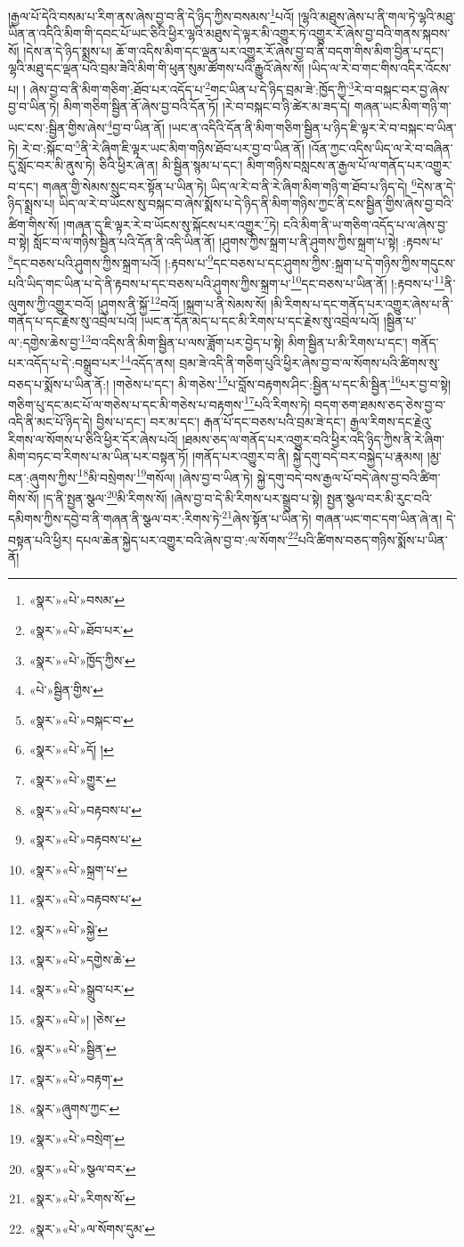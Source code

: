 །རྒྱལ་པོ་དེའི་བསམ་པ་རིག་ནས་ཞེས་བྱ་བ་ནི་དེ་ཉིད་ཀྱིས་བསམས་\footnote{«སྣར་»«པེ་»བསམ་}པའོ། །ལྷའི་མཐུས་ཞེས་པ་ནི་གལ་ཏེ་ལྷའི་མཐུ་ཡིན་ན་འདིའི་མིག་གི་དབང་པོ་ཡང་ཅིའི་ཕྱིར་ལྷའི་མཐུས་དེ་ལྟར་མི་འགྱུར་ཏེ་འགྱུར་རོ་ཞེས་བྱ་བའི་གནས་སྐབས་སོ། །དེས་ན་དེ་ཉིད་སྨྲས་པ། ཆོ་ག་འདིས་མིག་དང་ལྡན་པར་འགྱུར་རོ་ཞེས་བྱ་བ་ནི་བདག་གིས་མིག་བྱིན་པ་དང་། ལྷའི་མཐུ་དང་ལྡན་པའི་བྲམ་ཟེའི་མིག་གི་ཕུན་སུམ་ཚོགས་པའི་རྒྱུའོ་ཞེས་སོ། །ཡིད་ལ་རེ་བ་གང་གིས་འདིར་འོངས་པ། །
ཞེས་བྱ་བ་ནི་མིག་གཅིག་:ཐོབ་པར་འདོད་པ་\footnote{«སྣར་»«པེ་»ཐོབ་པར་}གང་ཡིན་པ་དེ་ཉིད་བྲམ་ཟེ་:ཁྱོད་ཀྱི་\footnote{«སྣར་»«པེ་»ཁྱོད་ཀྱིས་}རེ་བ་བསྐང་བར་བྱ་ཞེས་བྱ་བ་ཡིན་ཏེ། མིག་གཅིག་སྦྱིན་ནོ་ཞེས་བྱ་བའི་དོན་ཏོ། །རེ་བ་བསྐང་བ་ཉི་ཚེར་མ་ཟད་དེ། གཞན་ཡང་མིག་གཉི་ག་ཡང་ངས་:སྦྱིན་གྱིས་ཞེས་\footnote{«པེ་»སྦྱིན་གྱིས་}བྱ་བ་ཡིན་ནོ། །ཡང་ན་འདིའི་དོན་ནི་མིག་གཅིག་སྦྱིན་པ་ཉིད་ཇི་ལྟར་རེ་བ་བསྐང་བ་ཡིན་ཏེ། རེ་བ་:སྐོང་བ་\footnote{«སྣར་»«པེ་»བསྐང་བ་}ནི་རེ་ཞིག་ཇི་ལྟར་ཡང་མིག་གཉིས་ཐོབ་པར་བྱ་བ་ཡིན་ནོ། །འོན་ཀྱང་འདིས་ཡིད་ལ་རེ་བ་བཞིན་དུ་སློང་བར་མི་ནུས་ཏེ། ཅིའི་ཕྱིར་ཞེ་ན། མི་སྦྱིན་སྙམ་པ་དང་། མིག་གཉིས་བསླངས་ན་རྒྱལ་པོ་ལ་གནོད་པར་འགྱུར་བ་དང་། གཞན་གྱི་སེམས་སྲུང་བར་སྟོན་པ་ཡིན་ཏེ། ཡིད་ལ་རེ་བ་ནི་རེ་ཞིག་མིག་གཉི་ག་ཐོབ་པ་ཉིད་དེ། \footnote{«སྣར་»«པེ་»དོ། ། }དེས་ན་དེ་ཉིད་སྨྲས་པ། ཡིད་ལ་རེ་བ་ཡོངས་སུ་བསྐང་བ་ཞེས་སྨོས་པ་དེ་ཉིད་ནི་མིག་གཉིས་ཀྱང་ནི་ངས་སྦྱིན་གྱིས་ཞེས་བྱ་བའི་ཚིག་གིས་སོ། །གཞན་དུ་ཇི་ལྟར་རེ་བ་ཡོངས་སུ་སྐོངས་པར་འགྱུར་\footnote{«སྣར་»«པེ་»གྱུར་}ཏེ། ངའི་མིག་ནི་ཡ་གཅིག་འདོད་པ་ལ་ཞེས་བྱ་བ་སྟེ། སློང་བ་ལ་གཉིས་སྦྱིན་པའི་དོན་ནི་འདི་ཡིན་ནོ། །ཤུགས་ཀྱིས་སྐྲག་པ་ནི་ཤུགས་ཀྱིས་སྐྲག་པ་སྟེ། :རྟབས་པ་\footnote{«སྣར་»«པེ་»བརྟབས་པ་}དང་བཅས་པའི་ཤུགས་ཀྱིས་སྐྲག་པའོ། །:རྟབས་པ་\footnote{«སྣར་»«པེ་»བརྟབས་པ་}དང་བཅས་པ་དང་ཤུགས་ཀྱིས་:སྐྲག་པ་དེ་གཉིས་ཀྱིས་གདུངས་པའི་ཡིད་གང་ཡིན་པ་དེ་ནི་རྟབས་པ་དང་བཅས་པའི་ཤུགས་ཀྱིས་སྐྲག་པ་\footnote{«སྣར་»«པེ་»སྐྲག་པ་}དང་བཅས་པ་ཡིན་ནོ། །:རྟབས་པ་\footnote{«སྣར་»«པེ་»བརྟབས་པ་}ནི་ལུགས་ཀྱི་འགྱུར་བའོ། །ཤུགས་ནི་སྐྱོ་\footnote{«སྣར་»«པེ་»སྐྱེ་}བའོ། །སྐྲག་པ་ནི་སེམས་སོ། །མི་རིགས་པ་དང་གནོད་པར་འགྱུར་ཞེས་པ་ནི་གནོད་པ་དང་རྗེས་སུ་འབྲེལ་པའོ། །ཡང་ན་དོན་མེད་པ་དང་མི་རིགས་པ་དང་རྗེས་སུ་འབྲེལ་པའོ། །སྦྱིན་པ་ལ་:དགྱེས་ཆེས་བྱ་\footnote{«སྣར་»«པེ་»དགྱེས་ཆེ་}བ་འདིས་ནི་མིག་སྦྱིན་པ་ལས་ཟློག་པར་བྱེད་པ་སྟེ། མིག་སྦྱིན་པ་མི་རིགས་པ་དང་། གནོད་པར་འདོད་པ་དེ་:བསྒྲུབ་པར་\footnote{«སྣར་»«པེ་»སྒྲུབ་པར་}འདོད་ནས། བྲམ་ཟེ་འདི་ནི་གཅིག་པུའི་ཕྱིར་ཞེས་བྱ་བ་ལ་སོགས་པའི་ཚིགས་སུ་བཅད་པ་སྨོས་པ་ཡིན་ནོ:། །གཅེས་པ་དང་། མི་གཅེས་\footnote{«སྣར་»«པེ་»། །ཅེས་}པ་བློས་བརྟགས་ཤིང་:སྦྱིན་པ་དང་མི་སྦྱིན་\footnote{«སྣར་»«པེ་»སྦྱིན་}པར་བྱ་བ་སྟེ། གཅིག་པུ་དང་མང་པོ་ལ་གཅེས་པ་དང་མི་གཅེས་པ་བརྟགས་\footnote{«སྣར་»«པེ་»བརྟག་}པའི་རིགས་ཏེ། བདག་ཅག་ཐམས་ཅད་ཅེས་བྱ་བ་འདི་ནི་མང་པོ་ཉིད་དེ། བྱིས་པ་དང་། བར་མ་དང་། རྒན་པོ་དང་བཅས་པའི་བྲམ་ཟེ་དང་། རྒྱལ་རིགས་དང་རྗེའུ་རིགས་ལ་སོགས་པ་ཅིའི་ཕྱིར་དོར་ཞེས་པའོ། །ཐམས་ཅད་ལ་གནོད་པར་འགྱུར་བའི་ཕྱིར་འདི་ཉིད་ཀྱིས་ནི་རེ་ཞིག་མིག་བཏང་བ་རིགས་པ་མ་ཡིན་པར་བསྟན་ཏོ། །གནོད་པར་འགྱུར་བ་ནི། སྐྱེ་དགུ་བདེ་བར་བསྐྱེད་པ་རྣམས། །མྱ་ངན་:ཞུགས་ཀྱིས་\footnote{«སྣར་»ཞུགས་ཀྱང་}མི་བསྲེགས་\footnote{«སྣར་»«པེ་»བསྲེག་}གསོལ། །ཞེས་བྱ་བ་ཡིན་ཏེ། སྐྱེ་དགུ་བདེ་བས་རྒྱལ་པོ་བདེ་ཞེས་བྱ་བའི་ཚིག་གིས་སོ། །ད་ནི་སྤྱན་སྩལ་\footnote{«སྣར་»«པེ་»སྩལ་བར་}མི་རིགས་སོ། །ཞེས་བྱ་བ་དེ་མི་རིགས་པར་སྒྲུབ་པ་སྟེ། སྤྱན་སྩལ་བར་མི་རུང་བའི་དམིགས་ཀྱིས་དབྱེ་བ་ནི་གཞན་ནི་སྩལ་བར་:རིགས་ཏེ་\footnote{«སྣར་»«པེ་»རིགས་སོ་}ཞེས་སྟོན་པ་ཡིན་ཏེ། གཞན་ཡང་གང་དག་ཡིན་ཞེ་ན། དེ་བསྟན་པའི་ཕྱིར། དཔལ་ཆེན་སྐྱེད་པར་འགྱུར་བའི་ཞེས་བྱ་བ་:ལ་སོགས་\footnote{«སྣར་»«པེ་»ལ་སོགས་དུམ་}པའི་ཚིགས་བཅད་གཉིས་སྨོས་པ་ཡིན་ནོ། 